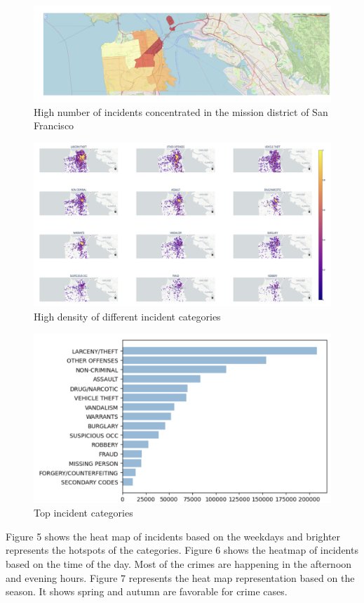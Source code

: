\documentclass[conference,final,]{IEEEtran}
\begin{document}
\begin{figure}

{\centering \includegraphics[width=0.5\linewidth]{img/fig2} 

}

\caption{High number of incidents concentrated in the mission district of San Francisco}\label{fig:unnamed-chunk-2}
\end{figure}

\begin{figure}

{\centering \includegraphics[width=0.5\linewidth]{img/fig3} 

}

\caption{High density of different incident categories}\label{fig:unnamed-chunk-3}
\end{figure}

\begin{figure}

{\centering \includegraphics[width=0.5\linewidth]{img/fig4} 

}

\caption{Top incident categories}\label{fig:unnamed-chunk-4}
\end{figure}

Figure 5 shows the heat map of incidents based on the weekdays and
brighter represents the hotspots of the categories. Figure 6 shows the
heatmap of incidents based on the time of the day. Most of the crimes
are happening in the afternoon and evening hours. Figure 7 represents
the heat map representation based on the season. It shows spring and
autumn are favorable for crime cases.
\end{document}

